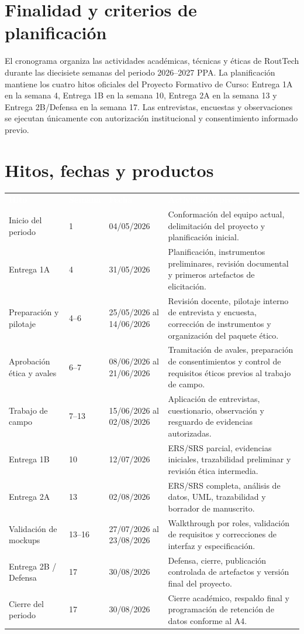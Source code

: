 \documentclass[10pt,a4paper]{article}
\begin{document}
\section{Finalidad y criterios de planificación}

El cronograma organiza las actividades académicas, técnicas y éticas de RoutTech durante las diecisiete semanas del periodo 2026--2027 PPA. La planificación mantiene los cuatro hitos oficiales del Proyecto Formativo de Curso: Entrega 1A en la semana 4, Entrega 1B en la semana 10, Entrega 2A en la semana 13 y Entrega 2B/Defensa en la semana 17. Las entrevistas, encuestas y observaciones se ejecutan únicamente con autorización institucional y consentimiento informado previo.

\section{Hitos, fechas y productos}

{\small
{}
\noindent\begin{tabularx}{\textwidth}{L{3.25cm} C{1.55cm} C{3.35cm} Y}
\textcolor{white}{\textbf{Hito}} &
\textcolor{white}{\textbf{Semana}} &
\textcolor{white}{\textbf{Fecha}} &
\textcolor{white}{\textbf{Actividad y producto}}\\
Inicio del periodo & 1 & 04/05/2026 & Conformación del equipo actual, delimitación del proyecto y planificación inicial.\\
Entrega 1A & 4 & 31/05/2026 & Planificación, instrumentos preliminares, revisión documental y primeros artefactos de elicitación.\\
Preparación y pilotaje & 4--6 & 25/05/2026 al 14/06/2026 & Revisión docente, pilotaje interno de entrevista y encuesta, corrección de instrumentos y organización del paquete ético.\\
Aprobación ética y avales & 6--7 & 08/06/2026 al 21/06/2026 & Tramitación de avales, preparación de consentimientos y control de requisitos éticos previos al trabajo de campo.\\
Trabajo de campo & 7--13 & 15/06/2026 al 02/08/2026 & Aplicación de entrevistas, cuestionario, observación y resguardo de evidencias autorizadas.\\
Entrega 1B & 10 & 12/07/2026 & ERS/SRS parcial, evidencias iniciales, trazabilidad preliminar y revisión ética intermedia.\\
Entrega 2A & 13 & 02/08/2026 & ERS/SRS completa, análisis de datos, UML, trazabilidad y borrador de manuscrito.\\
Validación de mockups & 13--16 & 27/07/2026 al 23/08/2026 & Walkthrough por roles, validación de requisitos y correcciones de interfaz y especificación.\\
Entrega 2B / Defensa & 17 & 30/08/2026 & Defensa, cierre, publicación controlada de artefactos y versión final del proyecto.\\
Cierre del periodo & 17 & 30/08/2026 & Cierre académico, respaldo final y programación de retención de datos conforme al A4.\\
\end{tabularx}
}
\end{document}
